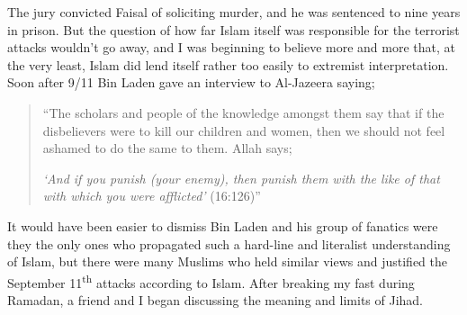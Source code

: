 \documentclass[12pt]{memoir}
\let \Sup=\textsuperscript
\newcommand{\QRef}[1]{{\color{darkblue}#1}}
\begin{document}
The jury convicted Faisal of soliciting murder,
and he was sentenced to nine years in prison.
But the question of how far Islam itself was responsible
for the terrorist attacks wouldn’t go away,
and I was beginning to believe more and more that, at the very least,
Islam did lend itself rather too easily to extremist interpretation.
Soon after 9/11 Bin Laden gave an interview to Al-Jazeera saying;

\begin{quote}
“The scholars and people of the knowledge amongst them say
that if the disbelievers were to kill our children and women,
then we should not feel ashamed to do the same to them.
Allah says;

\emph{‘And if you punish (your enemy), then punish them with the like
of that with which you were afflicted’} (\QRef{16:126})”
\end{quote}

It would have been easier to dismiss Bin Laden and his group of fanatics
were they the only ones who propagated
such a hard-line and literalist understanding of Islam,
but there were many Muslims who held similar views
and justified the September 11\Sup{th} attacks according to Islam.
After breaking my fast during Ramadan,
a friend and I began discussing the meaning and limits of Jihad.
\end{document}
